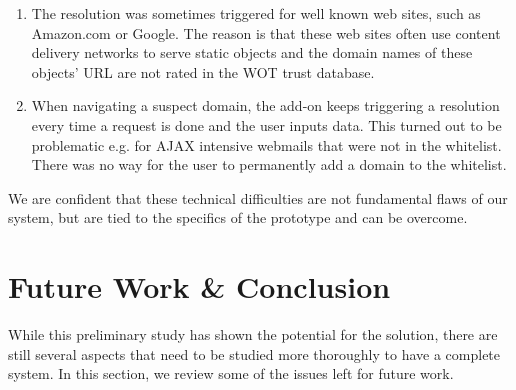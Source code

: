 \documentclass[11pt,styles/chicago]{article}
\begin{document}
\begin{enumerate}
\item The resolution was sometimes triggered for well known web sites, such as Amazon.com or Google. The reason is that these web sites often use content delivery networks to serve static objects and the domain names of these objects' URL are not rated in the WOT trust database.
\item When navigating a suspect domain, the add-on keeps triggering a resolution every time a request is done and the user inputs data. This turned out to be problematic e.g. for AJAX intensive webmails that were not in the whitelist. There was no way for the user to permanently add a domain to the whitelist.
\end{enumerate}

We are confident that these technical difficulties are not fundamental flaws of our system, but are tied to the specifics of the prototype and can be overcome.


\section{Future Work \& Conclusion} %

While this preliminary study has shown the potential for the solution, there are still several aspects that need to be studied more thoroughly to have a complete system. In this section, we review some of the issues left for future work.
\end{document}
